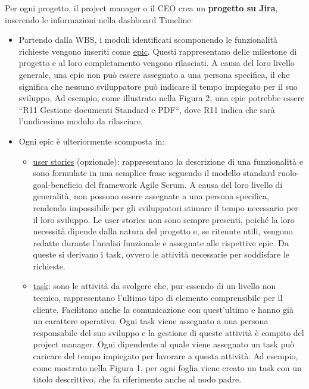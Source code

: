 
        Per ogni progetto, il project manager o il CEO crea un \textbf{progetto su Jira}, inserendo le informazioni nella dashboard Timeline:
        \begin{itemize}
            \item Partendo dalla \ac{WBS}, i moduli identificati scomponendo le funzionalità richieste vengono inseriti come \underline{epic}. Questi rappresentano
            delle milestone di progetto e al loro completamento vengono rilasciati. A causa del loro livello generale, una epic non può essere
            assegnato a una persona specifica, il che significa che nessuno sviluppatore può indicare il tempo impiegato per il suo sviluppo. Ad
            esempio, come illustrato nella Figura 2, una epic potrebbe essere “R11 Gestione documenti Standard e PDF“, dove R11 indica che sarà l’undicesimo modulo da rilasciare.

            \item Ogni epic è ulteriormente scomposta in:
                \begin{itemize}
                    \item \underline{user stories} (opzionale): rappresentano la descrizione di una funzionalità e sono formulate in una semplice frase seguendo
                    il modello standard ruolo-goal-beneficio del framework Agile Scrum. A causa del loro livello di generalità, non possono essere 
                    assegnate a una persona specifica, rendendo impossibile per gli sviluppatori stimare il tempo necessario per il loro sviluppo. Le 
                    user stories non sono sempre presenti, poiché la loro necessità dipende dalla natura del progetto e, se ritenute utili, vengono 
                    redatte durante l’analisi funzionale e assegnate alle rispettive epic. Da queste si derivano i task, ovvero le attività necessarie per soddisfare le richieste.

                    \item \underline{task}: sono le attività da svolgere che, pur essendo di un livello non tecnico, rappresentano l'ultimo tipo di elemento
                    comprensibile per il cliente. Facilitano anche la comunicazione con quest'ultimo e hanno già un carattere operativo. Ogni task
                    viene assegnato a una persona responsabile del suo sviluppo e la gestione di queste attività è compito del project manager. Ogni
                    dipendente al quale viene assegnato un task può caricare del tempo impiegato per lavorare a questa attività. Ad esempio, come mostrato
                    nella Figura 1, per ogni foglia viene creato un task con un titolo descrittivo, che fa riferimento anche al nodo padre.
                \end{itemize}
            

\end{itemize}
